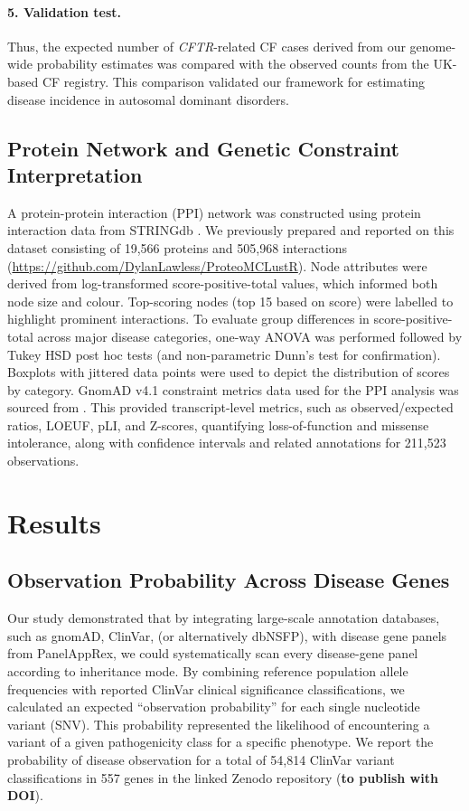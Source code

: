 \paragraph{5. Validation test.}
Thus, the expected number of \textit{CFTR}-related CF cases derived from our genome-wide probability estimates was compared with the observed counts from the UK-based CF registry. This comparison validated our framework for estimating disease incidence in autosomal dominant disorders.

\subsection{Protein Network and Genetic Constraint Interpretation}
A protein-protein interaction (PPI) network was constructed using protein interaction data from STRINGdb \cite{szklarczyk2025string}. We previously prepared and reported 
on this dataset consisting of 19,566 proteins and 505,968 interactions 
(\url{https://github.com/DylanLawless/ProteoMCLustR}).
Node attributes were derived from log-transformed score-positive-total values, which informed both node size and colour. Top-scoring nodes (top 15 based on score) were labelled to highlight prominent interactions. To evaluate group differences in score-positive-total across major disease categories, one-way ANOVA was performed followed by Tukey HSD post hoc tests (and non-parametric Dunn’s test for confirmation). Boxplots with jittered data points were used to depict the distribution of scores by category.
GnomAD v4.1 constraint metrics data used for the PPI analysis was sourced from \citet{karczewski2020mutational}.
This provided transcript-level metrics, such as observed/expected ratios, LOEUF, pLI, and Z-scores, quantifying loss-of-function and missense intolerance, along with confidence intervals and related annotations for 211,523 observations.



\section{Results}

\subsection{Observation Probability Across Disease Genes}

Our study demonstrated that by integrating large-scale annotation databases, such as gnomAD, ClinVar, (or alternatively dbNSFP), with disease gene panels from PanelAppRex, we could systematically scan every disease-gene panel according to inheritance mode. By combining reference population allele frequencies with reported ClinVar clinical significance classifications, we calculated an expected ``observation probability'' for each single nucleotide variant (SNV). This probability represented the likelihood of encountering a variant of a given pathogenicity class for a specific phenotype.
We report the probability of disease observation for a total of 54,814 ClinVar variant classifications in 557 genes in the linked Zenodo repository (\textbf{to publish with DOI}).

